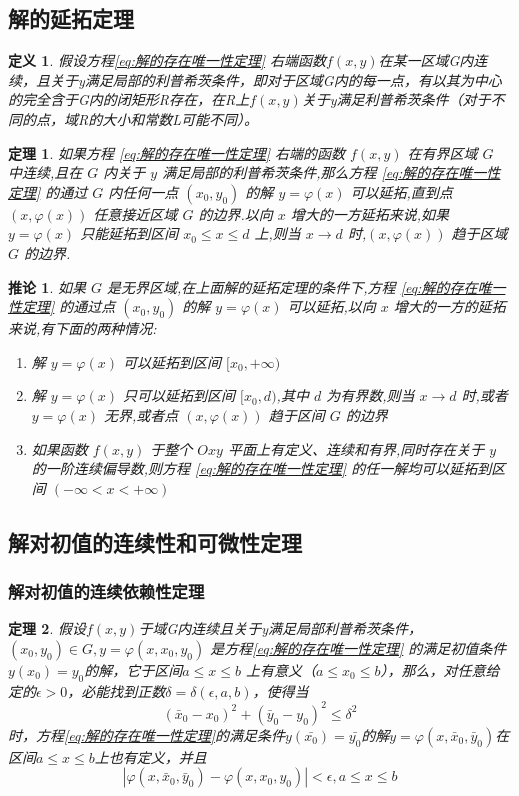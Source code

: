 \documentclass{ctexart}
\newtheorem{definition}{定义}[section]
\newtheorem{theorem}{定理}[section]
\newtheorem{inference}{推论}[section]
\numberwithin{equation}{subsection}
\begin{document}
\subsection{解的延拓定理}
\begin{definition}
        假设方程\eqref{eq:解的存在唯一性定理} 右端函数$f(x,y)$在某一区域G内连续，且关于y满足局部的利普希茨条件，即对于区域G内的每一点，有以其为中心的完全含于G内的闭矩形R存在，在R上$f(x,y)$关于y满足利普希茨条件（对于不同的点，域R的大小和常数L可能不同）。
 \end{definition}
\begin{theorem}
        \textcolor[rgb]{1,0,0}{ 如果方程 \eqref{eq:解的存在唯一性定理} 右端的函数 $f(x,y)$ 在有界区域 $G$ 中连续,且在 $G$ 内关于 $y$ 满足局部的利普希茨条件,那么方程 \eqref{eq:解的存在唯一性定理} 的通过 $G$ 内任何一点 $(x_0,y_0)$ 的解 $y=\varphi(x)$ 可以延拓,直到点 $(x,\varphi(x))$ 任意接近区域 $G$ 的边界.以向 $x$ 增大的一方延拓来说,如果 $y=\varphi(x)$ 只能延拓到区间 $x_0\leqslant x\leqslant d$ 上,则当 $x\to d$ 时,$(x,\varphi(x))$ 趋于区域 $G$ 的边界. }
\end{theorem}
\begin{inference}
        如果 $G$ 是无界区域,在上面解的延拓定理的条件下,方程 \eqref{eq:解的存在唯一性定理} 的通过点 $(x_0,y_0)$ 的解 $y=\varphi(x)$ 可以延拓,以向 $x$ 增大的一方的延拓来说,有下面的两种情况:
        \begin{enumerate}
                \item 解 $y=\varphi(x)$ 可以延拓到区间 $[x_0,+\infty)$
                \item 解 $y=\varphi(x)$ 只可以延拓到区间 $[x_0,d)$,其中 $d$ 为有界数,则当 $x\to d$ 时,或者 $y=\varphi(x)$ 无界,或者点 $(x,\varphi(x))$ 趋于区间 $G$ 的边界
                \item 如果函数 $f(x,y)$ 于整个 $Oxy$ 平面上有定义、连续和有界,同时存在关于 $y$ 的一阶连续偏导数,则方程 \eqref{eq:解的存在唯一性定理} 的任一解均可以延拓到区间 $(-\infty<x<+\infty)$
        \end{enumerate}
\end{inference}
\subsection{解对初值的连续性和可微性定理}
\subsubsection{解对初值的连续依赖性定理}
\begin{theorem}
        \textcolor[rgb]{1,0,0}{假设$f(x,y)$于域G内连续且关于y满足局部利普希茨条件，$(x_0,y_0) \in G,y = \varphi (x,x_0,y_0)$ 是方程\eqref{eq:解的存在唯一性定理} 的满足初值条件$y(x_0)=y_0$的解，它于区间$a \le x \le b$ 上有意义（$a \le x_0 \le b$），那么，对任意给定的$\epsilon >0$，必能找到正数$\delta=\delta(\epsilon,a,b)$，使得当\[
            (\bar{x}_0-x_0)^2+(\bar{y}_0-y_0)^2 \le \delta^2    
        \]时，方程\eqref{eq:解的存在唯一性定理}的满足条件$y(\bar{x_0})=\bar{y_0}$的解$y=\varphi(x,\bar{x}_0,\bar{y}_0)$在区间$a \le x \le b$上也有定义，并且\[|\varphi(x,\bar{x}_0,\bar{y}_0)-\varphi(x,x_0,y_0)|<\epsilon,a \le x \le b \] }
\end{theorem}
\end{document}

